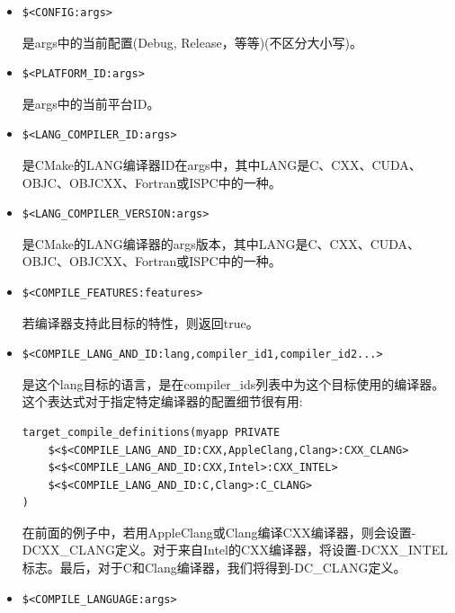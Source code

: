 \begin{itemize}
\item 
\begin{lstlisting}[style=styleCMake]
$<CONFIG:args>
\end{lstlisting}
是args中的当前配置(Debug, Release，等等)(不区分大小写)。

\item 
\begin{lstlisting}[style=styleCMake]
$<PLATFORM_ID:args>
\end{lstlisting}
是args中的当前平台ID。

\item 
\begin{lstlisting}[style=styleCMake]
$<LANG_COMPILER_ID:args>
\end{lstlisting}
是CMake的LANG编译器ID在args中，其中LANG是C、CXX、CUDA、OBJC、OBJCXX、Fortran或ISPC中的一种。

\item 
\begin{lstlisting}[style=styleCMake]
$<LANG_COMPILER_VERSION:args>
\end{lstlisting}
是CMake的LANG编译器的args版本，其中LANG是C、CXX、CUDA、OBJC、OBJCXX、Fortran或ISPC中的一种。

\item 
\begin{lstlisting}[style=styleCMake]
$<COMPILE_FEATURES:features>
\end{lstlisting}
若编译器支持此目标的特性，则返回true。

\item 
\begin{lstlisting}[style=styleCMake]
$<COMPILE_LANG_AND_ID:lang,compiler_id1,compiler_id2...>
\end{lstlisting}
是这个lang目标的语言，是在compiler\_ids列表中为这个目标使用的编译器。这个表达式对于指定特定编译器的配置细节很有用:

\begin{lstlisting}[style=styleCMake]
target_compile_definitions(myapp PRIVATE
	$<$<COMPILE_LANG_AND_ID:CXX,AppleClang,Clang>:CXX_CLANG>
	$<$<COMPILE_LANG_AND_ID:CXX,Intel>:CXX_INTEL>
	$<$<COMPILE_LANG_AND_ID:C,Clang>:C_CLANG>
)
\end{lstlisting}

在前面的例子中，若用AppleClang或Clang编译CXX编译器，则会设置-DCXX\_CLANG定义。对于来自Intel的CXX编译器，将设置-DCXX\_INTEL标志。最后，对于C和Clang编译器，我们将得到-DC\_CLANG定义。

\item 
\begin{lstlisting}[style=styleCMake]
$<COMPILE_LANGUAGE:args>
\end{lstlisting}


\end{itemize}
